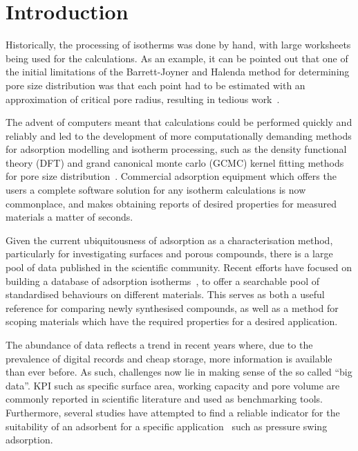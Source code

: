 
\section{Introduction}

Historically, the processing of isotherms was done by hand, with large
worksheets being used for the calculations. As an example,
it can be pointed out that one of the initial limitations of the
Barrett-Joyner and Halenda method for determining pore size distribution
was that each point had to be estimated with an approximation of critical
pore radius, resulting in tedious 
work~\cite{barrettDeterminationPoreVolume1951}.

The advent of computers meant that calculations could be performed
quickly and reliably and led to the development of more computationally
demanding methods for adsorption modelling and isotherm processing, such 
as the density functional theory (DFT) and grand canonical monte carlo 
(GCMC) kernel fitting methods for pore size 
distribution~\cite{seatonNewAnalysisMethod1989,%
	tarazonaPhaseEquilibriaFluid1987}.
Commercial adsorption equipment which offers the users
a complete software solution for any isotherm calculations is now
commonplace, and makes obtaining reports of desired properties
for measured materials a matter of seconds.

Given the current ubiquitousness of adsorption as a characterisation method,
particularly for investigating surfaces and porous compounds,
there is a large pool of data published in the scientific community.
Recent efforts have focused on building a database of adsorption
isotherms~\cite{sideriusNISTARPAEDatabase2015}, to offer a searchable
pool of standardised behaviours on different materials. This serves as
both a useful reference for comparing newly synthesised compounds, 
as well as a method for scoping materials which have the
required properties for a desired application.

The abundance of data reflects a trend in recent years where, due
to the prevalence of digital records and cheap storage, more
information is available than ever before. As such, challenges
now lie in making sense of the so called ``big data''.
\gls{KPI} such as specific surface area, working
capacity and pore volume are commonly reported in scientific literature
and used as benchmarking tools. Furthermore,
several studies have attempted to find a reliable indicator for
the suitability of an adsorbent for a specific
application~\cite{regeSimpleParameterSelecting2001, %
	ackley2000psa,%
	wiersumAdsorbentPerformanceIndicator2013} such as pressure swing
adsorption.

